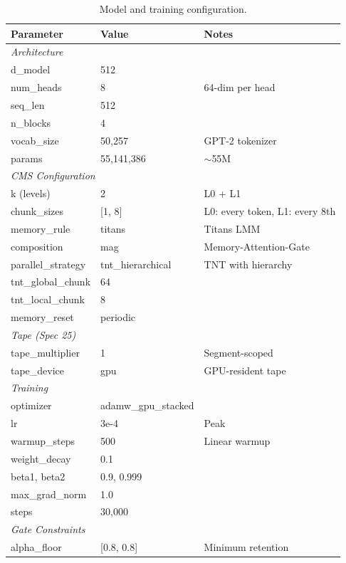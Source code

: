 \documentclass[11pt,a4paper]{article}
\begin{document}
\begin{table}[H]
\centering
\caption{Model and training configuration.}
\begin{tabular}{lll}
\toprule
\textbf{Parameter} & \textbf{Value} & \textbf{Notes} \\
\midrule
\multicolumn{3}{l}{\textit{Architecture}} \\
\quad d\_model & 512 & \\
\quad num\_heads & 8 & 64-dim per head \\
\quad seq\_len & 512 & \\
\quad n\_blocks & 4 & \\
\quad vocab\_size & 50,257 & GPT-2 tokenizer \\
\quad params & 55,141,386 & $\sim$55M \\
\midrule
\multicolumn{3}{l}{\textit{CMS Configuration}} \\
\quad k (levels) & 2 & L0 + L1 \\
\quad chunk\_sizes & [1, 8] & L0: every token, L1: every 8th \\
\quad memory\_rule & titans & Titans LMM \\
\quad composition & mag & Memory-Attention-Gate \\
\quad parallel\_strategy & tnt\_hierarchical & TNT with hierarchy \\
\quad tnt\_global\_chunk & 64 & \\
\quad tnt\_local\_chunk & 8 & \\
\quad memory\_reset & periodic & \\
\midrule
\multicolumn{3}{l}{\textit{Tape (Spec 25)}} \\
\quad tape\_multiplier & 1 & Segment-scoped \\
\quad tape\_device & gpu & GPU-resident tape \\
\midrule
\multicolumn{3}{l}{\textit{Training}} \\
\quad optimizer & adamw\_gpu\_stacked & \\
\quad lr & 3e-4 & Peak \\
\quad warmup\_steps & 500 & Linear warmup \\
\quad weight\_decay & 0.1 & \\
\quad beta1, beta2 & 0.9, 0.999 & \\
\quad max\_grad\_norm & 1.0 & \\
\quad steps & 30,000 & \\
\midrule
\multicolumn{3}{l}{\textit{Gate Constraints}} \\
\quad alpha\_floor & [0.8, 0.8] & Minimum retention \\

\end{tabular}
\end{table}
\end{document}

